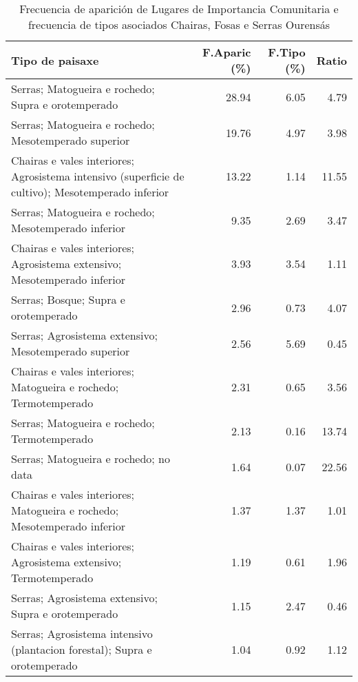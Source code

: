 \begin{table}[p]
\centering
\caption{Frecuencia de aparición de Lugares de Importancia Comunitaria e frecuencia de tipos asociados Chairas, Fosas e Serras Ourensás} 
\label{vnatura8}
\begin{tabular}{lrrr}
  \hline
Tipo de paisaxe & F.Aparic (\%) & F.Tipo (\%) & Ratio \\ 
  \hline
Serras; Matogueira e rochedo; Supra e orotemperado & 28.94 & 6.05 & 4.79 \\ 
  Serras; Matogueira e rochedo; Mesotemperado superior & 19.76 & 4.97 & 3.98 \\ 
  Chairas e vales interiores; Agrosistema intensivo (superficie de cultivo); Mesotemperado inferior & 13.22 & 1.14 & 11.55 \\ 
  Serras; Matogueira e rochedo; Mesotemperado inferior & 9.35 & 2.69 & 3.47 \\ 
  Chairas e vales interiores; Agrosistema extensivo; Mesotemperado inferior & 3.93 & 3.54 & 1.11 \\ 
  Serras; Bosque; Supra e orotemperado & 2.96 & 0.73 & 4.07 \\ 
  Serras; Agrosistema extensivo; Mesotemperado superior & 2.56 & 5.69 & 0.45 \\ 
  Chairas e vales interiores; Matogueira e rochedo; Termotemperado & 2.31 & 0.65 & 3.56 \\ 
  Serras; Matogueira e rochedo; Termotemperado & 2.13 & 0.16 & 13.74 \\ 
  Serras; Matogueira e rochedo; no data & 1.64 & 0.07 & 22.56 \\ 
  Chairas e vales interiores; Matogueira e rochedo; Mesotemperado inferior & 1.37 & 1.37 & 1.01 \\ 
  Chairas e vales interiores; Agrosistema extensivo; Termotemperado & 1.19 & 0.61 & 1.96 \\ 
  Serras; Agrosistema extensivo; Supra e orotemperado & 1.15 & 2.47 & 0.46 \\ 
  Serras; Agrosistema intensivo (plantacion forestal); Supra e orotemperado & 1.04 & 0.92 & 1.12 \\ 
   \hline
\end{tabular}
\end{table}
